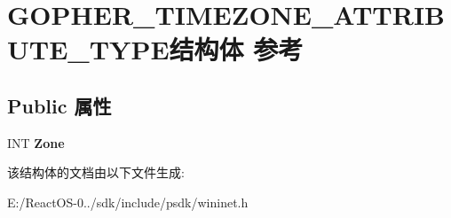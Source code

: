 \hypertarget{struct_g_o_p_h_e_r___t_i_m_e_z_o_n_e___a_t_t_r_i_b_u_t_e___t_y_p_e}{}\section{G\+O\+P\+H\+E\+R\+\_\+\+T\+I\+M\+E\+Z\+O\+N\+E\+\_\+\+A\+T\+T\+R\+I\+B\+U\+T\+E\+\_\+\+T\+Y\+P\+E结构体 参考}
\label{struct_g_o_p_h_e_r___t_i_m_e_z_o_n_e___a_t_t_r_i_b_u_t_e___t_y_p_e}
\subsection*{Public 属性}
\begin{DoxyCompactItemize}
\item 
\mbox{\label{struct_g_o_p_h_e_r___t_i_m_e_z_o_n_e___a_t_t_r_i_b_u_t_e___t_y_p_e_a45e3abb21c1e03b6f9f123fc349d2b8b}} 
I\+NT {\bfseries Zone}
\end{DoxyCompactItemize}


该结构体的文档由以下文件生成\+:\begin{DoxyCompactItemize}
\item 
E\+:/\+React\+O\+S-\/0../sdk/include/psdk/wininet.\+h\end{DoxyCompactItemize}
